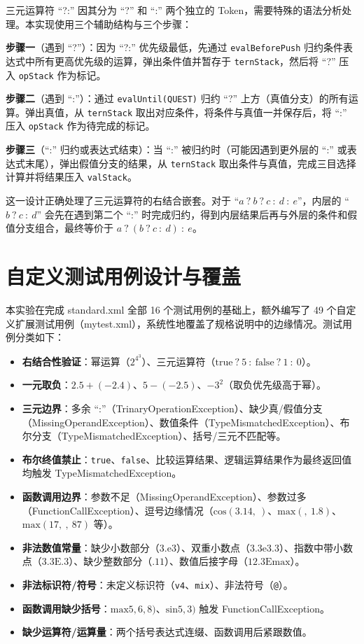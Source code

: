 三元运算符 ``?:'' 因其分为 ``?'' 和 ``:'' 两个独立的 Token，需要特殊的语法分析处理。本实现使用三个辅助结构与三个步骤：

\textbf{步骤一}（遇到 ``?''）：因为 ``?:'' 优先级最低，先通过 \texttt{evalBeforePush} 归约条件表达式中所有更高优先级的运算，弹出条件值并暂存于 \texttt{ternStack}，然后将 ``?'' 压入 \texttt{opStack} 作为标记。

\textbf{步骤二}（遇到 ``:''）：通过 \texttt{evalUntil(QUEST)} 归约 ``?'' 上方（真值分支）的所有运算。弹出真值，从 \texttt{ternStack} 取出对应条件，将条件与真值一并保存后，将 ``:'' 压入 \texttt{opStack} 作为待完成的标记。

\textbf{步骤三}（``:'' 归约或表达式结束）：当 ``:'' 被归约时（可能因遇到更外层的 ``:'' 或表达式末尾），弹出假值分支的结果，从 \texttt{ternStack} 取出条件与真值，完成三目选择计算并将结果压入 \texttt{valStack}。

这一设计正确处理了三元运算符的右结合嵌套。对于 ``$a\ ?\ b\ ?\ c\ :\ d\ :\ e$''，内层的 ``$b\ ?\ c\ :\ d$'' 会先在遇到第二个 ``:'' 时完成归约，得到内层结果后再与外层的条件和假值分支组合，最终等价于 $a\ ?\ (b\ ?\ c\ :\ d)\ :\ e$。

\section{自定义测试用例设计与覆盖}

本实验在完成 standard.xml 全部 16 个测试用例的基础上，额外编写了 49 个自定义扩展测试用例（mytest.xml），系统性地覆盖了规格说明中的边缘情况。测试用例分类如下：

\begin{itemize}
    \item \textbf{右结合性验证}：幂运算（$2^{4^{3}}$）、三元运算符（$\text{true}\ ?\ 5\ :\ \text{false}\ ?\ 1\ :\ 0$）。
    \item \textbf{一元取负}：$2.5 + (-2.4)$、$5 - (-2.5)$、$-3^2$（取负优先级高于幂）。
    \item \textbf{三元边界}：多余 ``:''（TrinaryOperationException）、缺少真/假值分支（MissingOperandException）、数值条件（TypeMismatchedException）、布尔分支（TypeMismatchedException）、括号/三元不匹配等。
    \item \textbf{布尔终值禁止}：\texttt{true}、\texttt{false}、比较运算结果、逻辑运算结果作为最终返回值均触发 TypeMismatchedException。
    \item \textbf{函数调用边界}：参数不足（MissingOperandException）、参数过多（FunctionCallException）、逗号边缘情况（$\text{cos}(3.14,\ )$、$\text{max}(,\ 1.8)$、$\text{max}(17,\ ,\ 87)$ 等）。
    \item \textbf{非法数值常量}：缺少小数部分（$3.\text{e}3$）、双重小数点（$3.3\text{e}3.3$）、指数中带小数点（$3.3\text{E}.3$）、缺少整数部分（$.11$）、数值后接字母（$12.3\text{Emax}$）。
    \item \textbf{非法标识符/符号}：未定义标识符（\texttt{v4}、\texttt{mix}）、非法符号（\texttt{@}）。
    \item \textbf{函数调用缺少括号}：$\text{max}5,6,8)$、$\text{sin}5,3)$ 触发 FunctionCallException。
    \item \textbf{缺少运算符/运算量}：两个括号表达式连缀、函数调用后紧跟数值。
\end{itemize}

